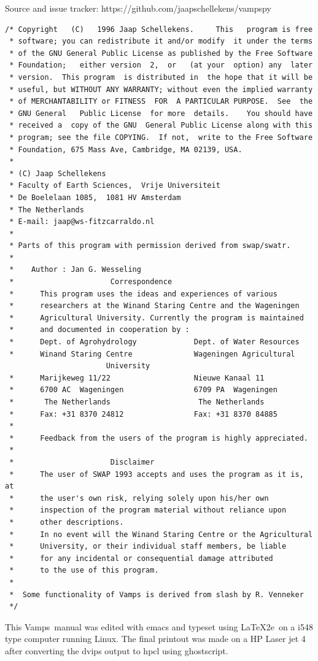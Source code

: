 \documentclass[11pt]{book}
\newcommand{\vamps}{{\sf Vamps}}
\newcommand{\url}[1]{#1}
\begin{document}
Source and issue tracker: \url{https://github.com/jaapschellekens/vampspy}
{\small
\begin{verbatim}
/* Copyright   (C)   1996 Jaap Schellekens.     This   program is free
 * software; you can redistribute it and/or modify  it under the terms
 * of the GNU General Public License as published by the Free Software
 * Foundation;   either version  2,  or   (at your  option) any  later
 * version.  This program  is distributed in  the hope that it will be
 * useful, but WITHOUT ANY WARRANTY; without even the implied warranty
 * of MERCHANTABILITY or FITNESS  FOR  A PARTICULAR PURPOSE.  See  the
 * GNU General   Public License  for more  details.    You should have
 * received a  copy of the GNU  General Public License along with this
 * program; see the file COPYING.  If not,  write to the Free Software
 * Foundation, 675 Mass Ave, Cambridge, MA 02139, USA.
 *
 * (C) Jaap Schellekens
 * Faculty of Earth Sciences,  Vrije Universiteit
 * De Boelelaan 1085,  1081 HV Amsterdam
 * The Netherlands
 * E-mail: jaap@ws-fitzcarraldo.nl
 *
 * Parts of this program with permission derived from swap/swatr.
 *
 *    Author : Jan G. Wesseling
 *                      Correspondence
 *      This program uses the ideas and experiences of various
 *      researchers at the Winand Staring Centre and the Wageningen
 *      Agricultural University. Currently the program is maintained
 *      and documented in cooperation by :
 *      Dept. of Agrohydrology             Dept. of Water Resources
 *      Winand Staring Centre              Wageningen Agricultural 
 					   University
 *      Marijkeweg 11/22                   Nieuwe Kanaal 11
 *      6700 AC  Wageningen                6709 PA  Wageningen
 *       The Netherlands                    The Netherlands
 *      Fax: +31 8370 24812                Fax: +31 8370 84885
 *
 *      Feedback from the users of the program is highly appreciated.
 *
 *                      Disclaimer
 *      The user of SWAP 1993 accepts and uses the program as it is, at
 *      the user's own risk, relying solely upon his/her own
 *      inspection of the program material without reliance upon
 *      other descriptions.
 *      In no event will the Winand Staring Centre or the Agricultural 
 *      University, or their individual staff members, be liable 
 *      for any incidental or consequential damage attributed
 *      to the use of this program.  
 *	
 *	Some functionality of Vamps is derived from slash by R. Venneker
 */
\end{verbatim}
}
This \vamps\ manual was edited with emacs and typeset using \LaTeX2e\ on a
i548 type computer running Linux. The final printout was made on a HP
Laser jet 4 after converting the dvips output to hpcl using
ghostscript.
\end{document}
